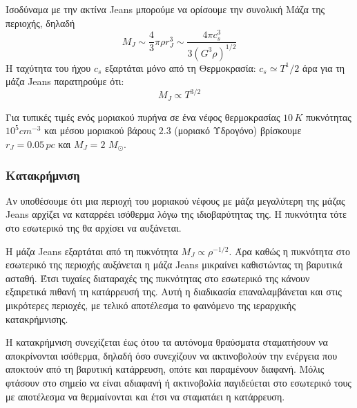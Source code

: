 \documentclass[a4paper,12pt]{memoir}
\newcommand{\sm}{$M_{\odot}$}
\begin{document}
Ισοδύναμα με την ακτίνα Jeans μπορούμε να ορίσουμε την συνολική Μάζα της περιοχής, δηλαδή
\begin{equation}
\boxed{M_J \sim \frac{4}{3} \pi \rho r_J ^3 \sim \frac{4\pi c_s ^3}{3 (G^3 \rho)^{1/2}}}
\end{equation}
Η ταχύτητα του ήχου $c_s$ εξαρτάται μόνο από τη Θερμοκρασία: $c_s \simeq T^1/2$ άρα για τη μάζα Jeans παρατηρούμε ότι:
\begin{equation}
M_J \propto T^{3/2}
\end{equation}

Για τυπικές τιμές ενός μοριακού πυρήνα σε ένα νέφος θερμοκρασίας $10 \, K$ πυκνότητας $10^5 cm^{-3}$ και μέσου μοριακού βάρους $2.3$ (μοριακό Υδρογόνο) βρίσκουμε $r_J=0.05 \,pc$ και $M_J =2$ \sm.

\subsubsection{Κατακρήμνιση}
Αν υποθέσουμε ότι μια περιοχή του μοριακού νέφους με μάζα μεγαλύτερη της μάζας Jeans αρχίζει να καταρρέει ισόθερμα λόγω της ιδιοβαρύτητας της. Η πυκνότητα τότε στο εσωτερικό της θα αρχίσει να αυξάνεται. 

Η μάζα Jeans εξαρτάται από τη πυκνότητα $M_J \propto \rho ^{-1/2}$. Άρα καθώς η πυκνότητα στο εσωτερικό της περιοχής αυξάνεται η μάζα Jeans μικραίνει καθιστώντας  τη βαρυτικά ασταθή. 
Έτσι τυχαίες διαταραχές της πυκνότητας στο εσωτερικό της κάνουν εξαιρετικά πιθανή τη κατάρρευσή της.
Αυτή η διαδικασία επαναλαμβάνεται και στις μικρότερες περιοχές, με τελικό αποτέλεσμα το φαινόμενο της ιεραρχικής κατακρήμνισης.

Η κατακρήμνιση συνεχίζεται έως ότου τα αυτόνομα θραύσματα σταματήσουν να αποκρίνονται ισόθερμα, δηλαδή όσο συνεχίζουν να ακτινοβολούν την ενέργεια που αποκτούν από τη βαρυτική κατάρρευση, οπότε και παραμένουν διαφανή. 
Μόλις φτάσουν στο σημείο να είναι αδιαφανή ή ακτινοβολία παγιδεύεται στο εσωτερικό τους με αποτέλεσμα να θερμαίνονται και έτσι να σταματάει η κατάρρευση.
\end{document}

